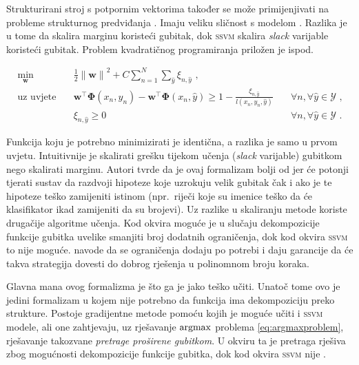 Strukturirani stroj s potpornim vektorima  također se može primijenjivati na probleme strukturnog
predviđanja \citep{tsochantaridis2005large}. Imaju veliku sličnost s modelom
\mmmm{}. Razlika je u tome da \mmmm{} skalira marginu koristeći gubitak, dok
\textsc{ssvm} skalira \textit{slack} varijable koristeći gubitak. Problem
kvadratičnog programiranja priložen je ispod.

\begin{equation}\label{eq:ssvm}
\begin{aligned}
  \min_{\mathbf{w}} & \quad \frac{1}{2} {\lVert\mathbf{w}\lVert}^2 + C \sum_{n=1}^{N}\sum_{\hat{y}} \xi_{n,\hat{y}} \text{ ,}              & \\
  \text{uz uvjete}  & \quad \mathbf{w}^\top \mathbf{\Phi}(x_n, y_n) - \mathbf{w}^\top \mathbf{\Phi}(x_n, \hat{y}) \ge 1 - \frac{\xi_{n,\hat{y}}}{l(x_n, y_n, \hat{y})} & \quad \forall n, \forall \hat{y} \in \mathcal{Y} \text{ ,}\\
                    & \quad \xi_{n,\hat{y}} \ge 0                                                                                          & \quad \forall n, \forall \hat{y} \in \mathcal{Y} \text{ .}
\end{aligned}
\end{equation}

Funkcija koju je potrebno minimizirati je identična, a razlika je samo u prvom
uvjetu. Intuitivnije je skalirati grešku tijekom učenja (\textit{slack}
varijable) gubitkom nego skalirati marginu. Autori tvrde da je ovaj formalizam
bolji od \mmmm{} jer će potonji tjerati sustav da razdvoji hipoteze koje
uzrokuju velik gubitak čak i ako je te hipoteze teško zamijeniti istinom
(npr.~riječi koje su imenice teško da će klasifikator ikad zamijeniti da su
brojevi). Uz razlike u skaliranju metode koriste drugačije algoritme učenja. Kod
\mmmm{} okvira moguće je u slučaju dekompozicije funkcije gubitka uvelike
smanjiti broj dodatnih ograničenja, dok kod okvira \textsc{ssvm} to nije moguće.
\citet{tsochantaridis2005large} navode da se ograničenja dodaju po potrebi i
daju garancije da će takva strategija dovesti do dobrog rješenja u polinomnom
broju koraka.

Glavna mana ovog formalizma je što ga je jako teško učiti. Unatoč tome ovo je
jedini formalizam u kojem nije potrebno da funkcija ima dekompoziciju preko
strukture. Postoje gradijentne metode pomoću kojih je moguće učiti \mmmm{} i
\textsc{ssvm} modele, ali one zahtjevaju, uz rješavanje $\operatorname*{argmax}$ problema
\ref{eq:argmaxproblem}, rješavanje takozvane \textit{pretrage proširene
gubitkom}. U \mmmm{} okviru ta je pretraga rješiva zbog mogućnosti dekompozicije
funkcije gubitka, dok kod okvira \textsc{ssvm} nije \citep{ratliff2006maximum}.
